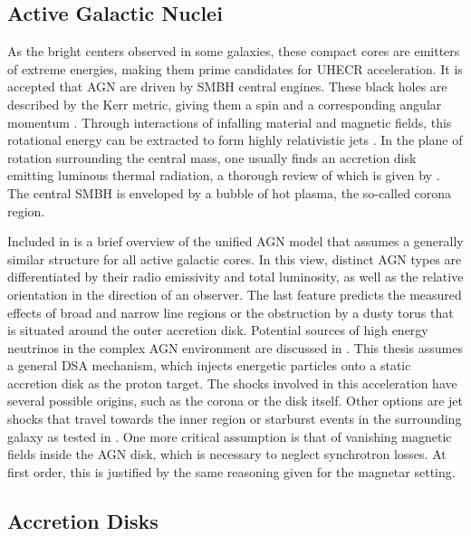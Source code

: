 \subsection{Active Galactic Nuclei}
\label{sub:nuclei}

As the bright centers observed in some galaxies, these compact cores are emitters of extreme energies, making them prime
candidates for UHECR acceleration. It is accepted that AGN are driven by SMBH central engines. These black holes are described
by the Kerr metric, giving them a spin and a corresponding angular momentum \cite{Visser_2008}. Through interactions of
infalling material and magnetic fields, this rotational energy can be extracted to form highly relativistic jets \cite{Blandford_2019}.
In the plane of rotation surrounding the central mass, one usually finds an accretion disk emitting luminous thermal radiation,
a thorough review of which is given by \cite{Abramowicz_2013}. The central SMBH is enveloped by a bubble of hot plasma, the so-called
corona region.

\newpage

Included in \cite{Beckmann_2013} is a brief overview of the unified AGN model that assumes a generally similar structure for all active
galactic cores. In this view, distinct AGN types are differentiated
by their radio emissivity and total luminosity, as well as the relative orientation in the direction of an observer. The
last feature predicts the measured effects of broad and narrow line regions or the obstruction by a dusty torus that is situated
around the outer accretion disk. Potential sources of high energy neutrinos in the complex AGN environment are discussed in \cite{Murase_2023}.
This thesis assumes a general DSA mechanism, which injects energetic particles onto a static accretion disk as the proton target.
The shocks involved in this acceleration have several possible origins, such as the corona or the disk itself. Other options are jet
shocks that travel towards the inner region or starburst events in the surrounding galaxy as tested in \cite{Eichmann_2022}. One more
critical assumption is that of vanishing magnetic fields inside the AGN disk, which is necessary to neglect synchrotron losses. At first
order, this is justified by the same reasoning given for the magnetar setting.



\subsection{Accretion Disks}
\label{sub:accretion}

